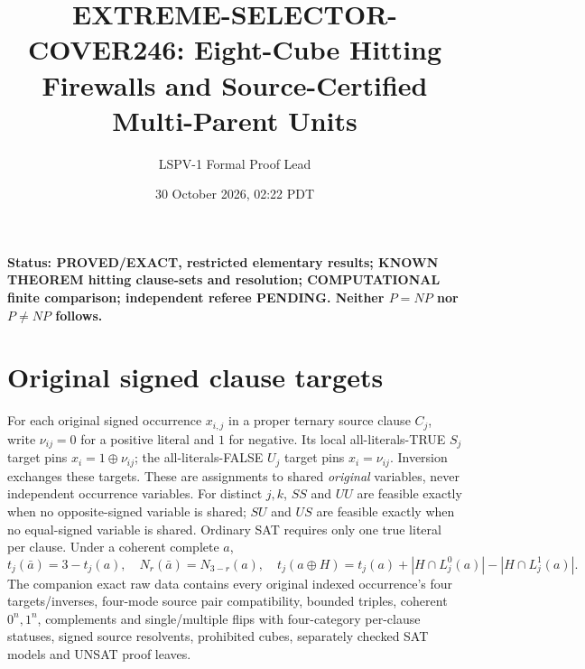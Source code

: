\documentclass[10pt]{article}
\title{EXTREME-SELECTOR-COVER246: Eight-Cube Hitting Firewalls and Source-Certified Multi-Parent Units}
\author{LSPV-1 Formal Proof Lead}
\date{30 October 2026, 02:22 PDT}
\begin{document}
\maketitle
\noindent\textbf{Status: PROVED/EXACT, restricted elementary results; KNOWN THEOREM hitting clause-sets and resolution; COMPUTATIONAL finite comparison; independent referee PENDING. Neither $P=NP$ nor $P\ne NP$ follows.}
\section{Original signed clause targets}
For each original signed occurrence $x_{i,j}$ in a proper ternary source clause $C_j$, write $\nu_{ij}=0$ for a positive literal and $1$ for negative. Its local all-literals-TRUE $S_j$ target pins $x_i=1\oplus\nu_{ij}$; the all-literals-FALSE $U_j$ target pins $x_i=\nu_{ij}$. Inversion exchanges these targets. These are assignments to shared \emph{original} variables, never independent occurrence variables. For distinct $j,k$, $SS$ and $UU$ are feasible exactly when no opposite-signed variable is shared; $SU$ and $US$ are feasible exactly when no equal-signed variable is shared. Ordinary SAT requires only one true literal per clause. Under a coherent complete $a$,
\[
t_j(\bar a)=3-t_j(a),\quad N_r(\bar a)=N_{3-r}(a),\quad
t_j(a\oplus H)=t_j(a)+|H\cap L_j^0(a)|-|H\cap L_j^1(a)|.
\]
The companion exact raw data contains every original indexed occurrence's four targets/inverses, four-mode source pair compatibility, bounded triples, coherent $0^n,1^n$, complements and single/multiple flips with four-category per-clause statuses, signed source resolvents, prohibited cubes, separately checked SAT models and UNSAT proof leaves.
\end{document}
